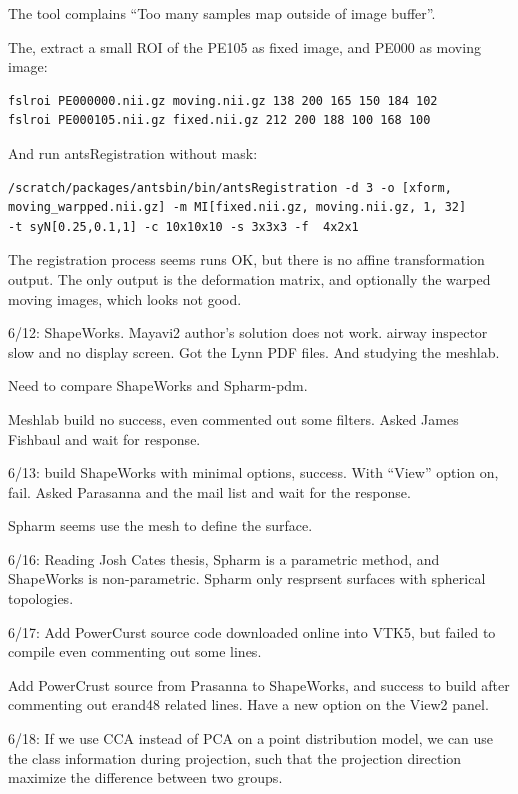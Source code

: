 \documentclass[12pt]{article}
\begin{document}
The tool complains ``Too many samples map outside of image buffer''.

The, extract a small ROI of the PE105 as fixed image, and PE000 as moving
image:
\begin{Verbatim}[frame=single]
fslroi PE000000.nii.gz moving.nii.gz 138 200 165 150 184 102 
fslroi PE000105.nii.gz fixed.nii.gz 212 200 188 100 168 100 
\end{Verbatim}

And run antsRegistration without mask:
\begin{Verbatim}[frame=single]
/scratch/packages/antsbin/bin/antsRegistration -d 3 -o [xform,
moving_warpped.nii.gz] -m MI[fixed.nii.gz, moving.nii.gz, 1, 32]
-t syN[0.25,0.1,1] -c 10x10x10 -s 3x3x3 -f  4x2x1 
\end{Verbatim}

The registration process seems runs OK, but there is no affine transformation
output. The only output is the deformation matrix, and optionally the warped
moving images, which looks not good. 

6/12: ShapeWorks. Mayavi2 author's solution does not work. airway inspector
slow and no display screen. Got the Lynn PDF files. And studying the meshlab. 

Need to compare ShapeWorks and Spharm-pdm. 

Meshlab build no success, even commented out some filters. Asked James
Fishbaul and wait for response. 

6/13: build ShapeWorks with minimal options, success. With ``View'' option on,
fail. Asked Parasanna and the mail list and wait for the response. 

Spharm seems use the mesh to define the surface. 

6/16: Reading Josh Cates thesis, Spharm is a parametric method, and ShapeWorks
is non-parametric. Spharm only resprsent surfaces with spherical topologies. 

6/17: Add PowerCurst source code downloaded online into VTK5, but failed to
compile even commenting out some lines. 

Add PowerCrust source from Prasanna to ShapeWorks, and success to build after
commenting out erand48 related lines. Have a new option on the View2 panel. 

6/18: If we use CCA instead of PCA on a point distribution model, we can use
the class information during projection, such that the projection direction
maximize the difference between two groups.

 

\end{document}
